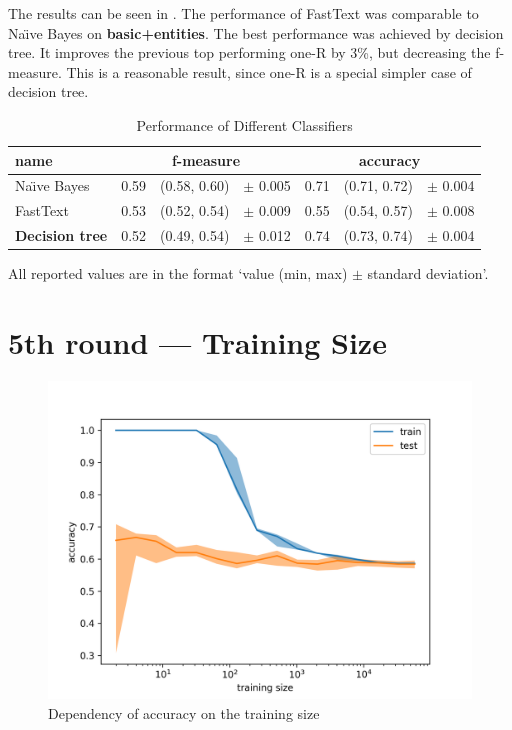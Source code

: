 The results can be seen in .
The performance of FastText was comparable to Na\"{\i}ve Bayes on \textbf{basic+entities}.
The best performance was achieved by decision tree.
It improves the previous top performing one-R by 3\%, but decreasing the f-measure.
This is a reasonable result, since one-R is a special simpler case of decision tree.


\begin{table}[h!]

\centering
\begin{tabular}{lr@{~}r@{~}rr@{~}r@{~}r}
\toprule
\textbf{name}	& \multicolumn{3}{c}{\textbf{f-measure}} & \multicolumn{3}{c}{\textbf{accuracy}} \\
\midrule

Na\"{\i}ve Bayes & 0.59 & (0.58, 0.60) & $\pm$ 0.005 & 0.71 & (0.71, 0.72) & $\pm$ 0.004		\\

FastText & 0.53 & (0.52, 0.54) & $\pm$ 0.009 & 0.55 & (0.54, 0.57) & $\pm$ 0.008 \\
\textbf{Decision tree} & 0.52 & (0.49, 0.54) & $\pm$ 0.012 & 0.74 & (0.73, 0.74) & $\pm$ 0.004 \\

\bottomrule
\end{tabular}

\caption{Performance of Different Classifiers}\label{tab:clsf_perf}
All reported values are in the format `value (min, max) $\pm$ standard deviation'.
\end{table}


\section{5th round --- Training Size}

\begin{figure}[h]\centering
\includegraphics[width=130mm]{figures/l_curves_accuracy.png}
\caption{Dependency of accuracy on the training size}
\label{fig:l_curves_accuracy}
\end{figure}

